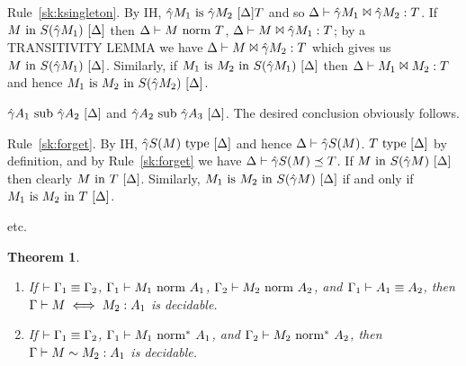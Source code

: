 \documentclass{article}
\theoremstyle{break}
\newtheorem{theorem}{Theorem}
\newcommand{\env}{\gamma}
\newcommand{\equivcontext}[2]{\vdash #1 \equiv #2}
\begin{document}
\item Rule~\ref{sk:ksingleton}.  By IH,
$\semanticequivtype{\world}{\hat\env\constructor_1}{\hat\env\constructor_2}{\ktype}$
and so 
$\conequiv{\world}{\hat\env\constructor_1}{\hat\env\constructor_2}{\ktype}$.
If
$\semanticvalidterm{\world}{\constructor}{\ksingleton{\hat\env\constructor_1}}$
then
${\Delta}\vdash{M}\mbox{\ norm\ }{T}$,
$\conequiv{\world}{\constructor}{\hat\env\constructor_1}{\ktype}$;
by a TRANSITIVITY LEMMA we have
$\conequiv{\world}{\constructor}{\hat\env\constructor_2}{\ktype}$
which gives us
$\semanticvalidterm{\world}{\constructor}{\ksingleton{\hat\env\constructor_1}}$.
Similarly, if
$\semanticequivterm{\world}{\constructor_1}{\constructor_2}{\ksingleton{\hat\env\constructor_1}}$
then 
$\Delta\vdash M_1 \Join M_2 : T$ and hence
$\semanticequivterm{\world}{\constructor_1}{\constructor_2}{\ksingleton{\hat\env\constructor_2}}$.

$\semanticsubtype{\world}{\hat\env\kind_1}{\hat\env\kind_2}$ and
$\semanticsubtype{\world}{\hat\env\kind_2}{\hat\env\kind_3}$.  The
desired conclusion obviously follows.

\item Rule~\ref{sk:forget}.  By IH,
$\semanticvalidtype{\world}{\hat\env\ksingleton{\constructor}}$ and
hence $\validkind{\world}{\hat\env\ksingleton{\constructor}}$.
${T}\mathrm{\ type\ }[\Delta]$ by definition, and 
by Rule~\ref{sk:forget} we have
$\subkind{\world}{\hat\env\ksingleton{\constructor}}{\ktype}$.
If
$\semanticvalidterm{\world}{\constructor}{\ksingleton{\hat\env\constructor}}$
then clearly
${M}\mathrm{\ in\ }{T}\ [\Delta]$.
Similarly,
$\semanticequivterm{\world}{\constructor_1}{\constructor_2}{\ksingleton{\hat\env\constructor}}$
if and only if
${M_1}\mathrm{\ is\ }{M_2}\mathrm{\ in\ }{T}\ [\Delta]$.

\item etc.
\fi


\begin{theorem}
\begin{enumerate}
\item If $\equivcontext{\context_1}{\context_2}$,
${\Gamma_1}\vdash{M_1}\mbox{\ norm\ }{A_1}$,
${\Gamma_2}\vdash{M_2}\mbox{\ norm\ }{A_2}$, and
$\Gamma_1\vdash A_1 \equiv A_2$,
then 
$\Gamma\vdash M \iff M_2 : A_1$
is decidable.
\item If $\equivcontext{\context_1}{\context_2}$,
${\Gamma_1}\vdash{M_1}\mbox{\ norm}^*\ {A_1}$, and
${\Gamma_2}\vdash{M_2}\mbox{\ norm}^*\ {A_2}$, then
$\Gamma\vdash M \sim M_2 : A_1$
is decidable.
\end{enumerate}
\end{theorem}
\end{document}
